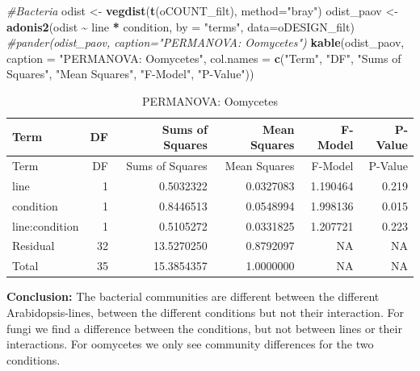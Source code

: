 \documentclass[
  11pt,
]{article}
\newenvironment{Shaded}{\begin{snugshade}}{\end{snugshade}}
\newcommand{\AttributeTok}[1]{\textcolor[rgb]{0.13,0.29,0.53}{#1}}
\newcommand{\CommentTok}[1]{\textcolor[rgb]{0.56,0.35,0.01}{\textit{#1}}}
\newcommand{\FunctionTok}[1]{\textcolor[rgb]{0.13,0.29,0.53}{\textbf{#1}}}
\newcommand{\NormalTok}[1]{#1}
\newcommand{\OtherTok}[1]{\textcolor[rgb]{0.56,0.35,0.01}{#1}}
\newcommand{\SpecialCharTok}[1]{\textcolor[rgb]{0.81,0.36,0.00}{\textbf{#1}}}
\newcommand{\StringTok}[1]{\textcolor[rgb]{0.31,0.60,0.02}{#1}}
\begin{document}
\begin{Shaded}
\begin{Highlighting}[]
\CommentTok{\#Bacteria}
\NormalTok{odist }\OtherTok{\textless{}{-}} \FunctionTok{vegdist}\NormalTok{(}\FunctionTok{t}\NormalTok{(oCOUNT\_filt), }\AttributeTok{method=}\StringTok{"bray"}\NormalTok{)}
\NormalTok{odist\_paov }\OtherTok{\textless{}{-}} \FunctionTok{adonis2}\NormalTok{(odist }\SpecialCharTok{\textasciitilde{}}\NormalTok{ line }\SpecialCharTok{*}\NormalTok{ condition, }\AttributeTok{by =} \StringTok{"terms"}\NormalTok{, }\AttributeTok{data=}\NormalTok{oDESIGN\_filt)}
\CommentTok{\#pander(odist\_paov, caption="PERMANOVA: Oomycetes")}
\FunctionTok{kable}\NormalTok{(odist\_paov, }\AttributeTok{caption =} \StringTok{"PERMANOVA: Oomycetes"}\NormalTok{,}
      \AttributeTok{col.names =} \FunctionTok{c}\NormalTok{(}\StringTok{"Term"}\NormalTok{, }\StringTok{"DF"}\NormalTok{, }\StringTok{"Sums of Squares"}\NormalTok{, }\StringTok{"Mean Squares"}\NormalTok{, }\StringTok{"F{-}Model"}\NormalTok{, }\StringTok{"P{-}Value"}\NormalTok{))}
\end{Highlighting}
\end{Shaded}

\begin{longtable}[]{@{}lrrrrr@{}}
\caption{PERMANOVA: Oomycetes}\tabularnewline
\toprule\noalign{}
Term & DF & Sums of Squares & Mean Squares & F-Model & P-Value \\
\midrule\noalign{}
\endfirsthead
\toprule\noalign{}
Term & DF & Sums of Squares & Mean Squares & F-Model & P-Value \\
\midrule\noalign{}
\endhead
\bottomrule\noalign{}
\endlastfoot
line & 1 & 0.5032322 & 0.0327083 & 1.190464 & 0.219 \\
condition & 1 & 0.8446513 & 0.0548994 & 1.998136 & 0.015 \\
line:condition & 1 & 0.5105272 & 0.0331825 & 1.207721 & 0.223 \\
Residual & 32 & 13.5270250 & 0.8792097 & NA & NA \\
Total & 35 & 15.3854357 & 1.0000000 & NA & NA \\
\end{longtable}

\textbf{Conclusion:} The bacterial communities are different between the
different Arabidopsis-lines, between the different conditions but not
their interaction. For fungi we find a difference between the
conditions, but not between lines or their interactions. For oomycetes
we only see community differences for the two conditions.
\end{document}
